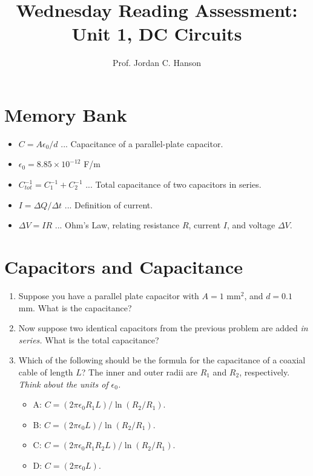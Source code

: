 \documentclass{article}
\begin{document}
\title{Wednesday Reading Assessment: Unit 1, DC Circuits}
\author{Prof. Jordan C. Hanson}

\maketitle

\section{Memory Bank}

\begin{itemize}
\item $C = A\epsilon_0/d$ ... Capacitance of a parallel-plate capacitor.
\item $\epsilon_0 = 8.85 \times 10^{-12}$ F/m
\item $C_{tot}^{-1} = C_1^{-1} + C_2^{-1}$ ... Total capacitance of two capacitors in series.
\item $I = \Delta Q/\Delta t$ ... Definition of current.
\item $\Delta V = I R$ ... Ohm's Law, relating resistance $R$, current $I$, and voltage $\Delta V$.\end{itemize}

\section{Capacitors and Capacitance}

\begin{enumerate}
\item Suppose you have a parallel plate capacitor with $A = 1$ mm$^2$, and $d = 0.1$ mm.  What is the capacitance? \\ \vspace{0.5cm}
\item Now suppose two identical capacitors from the previous problem are added \textit{in series.}  What is the total capacitance? \\ \vspace{0.5cm}
\item Which of the following should be the formula for the capacitance of a coaxial cable of length $L$?  The inner and outer radii are $R_1$ and $R_2$, respectively.  \textit{Think about the units of $\epsilon_0$.}
\begin{itemize}
\item A: $C = (2\pi\epsilon_0 R_1 L)/\ln(R_2/R_1)$.
\item B: $C = (2\pi\epsilon_0 L)/\ln(R_2/R_1)$.
\item C: $C = (2\pi\epsilon_0 R_1 R_2 L)/\ln(R_2/R_1)$.
\item D: $C = (2\pi\epsilon_0 L)$.
\end{itemize}
\end{enumerate}
\end{document}
